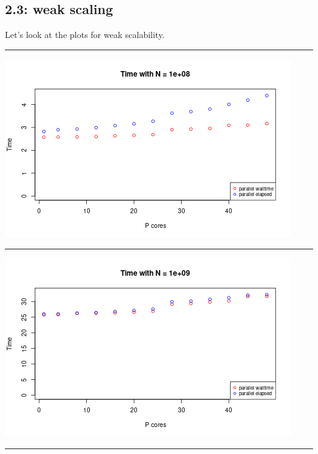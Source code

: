 \documentclass[
  10pt,
]{article}
\begin{document}
\hypertarget{weak-scaling}{%
\subsection{2.3: weak scaling}\label{weak-scaling}}

Let's look at the plots for weak scalability.

\begin{center}\rule{0.5\linewidth}{0.5pt}\end{center}

\begin{center}\includegraphics{figs/ws_time-1} \end{center}

\begin{center}\rule{0.5\linewidth}{0.5pt}\end{center}

\begin{center}\includegraphics{figs/ws_time-2} \end{center}

\begin{center}\rule{0.5\linewidth}{0.5pt}\end{center}
\end{document}
